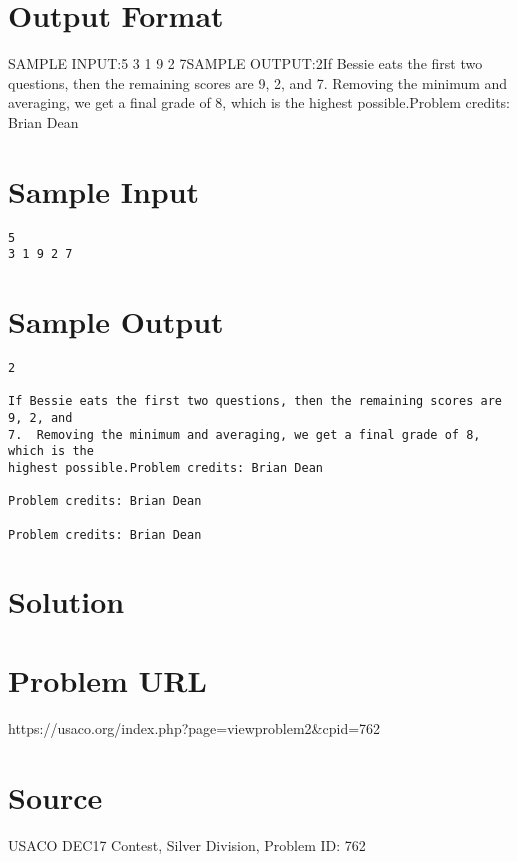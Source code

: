 \documentclass[12pt]{article}
\begin{document}
\section*{Output Format}
SAMPLE INPUT:5
3 1 9 2 7SAMPLE OUTPUT:2If Bessie eats the first two questions, then the remaining scores are 9, 2, and
7.  Removing the minimum and averaging, we get a final grade of 8, which is the
highest possible.Problem credits: Brian Dean

\section*{Sample Input}
\begin{verbatim}
5
3 1 9 2 7
\end{verbatim}

\section*{Sample Output}
\begin{verbatim}
2

If Bessie eats the first two questions, then the remaining scores are 9, 2, and
7.  Removing the minimum and averaging, we get a final grade of 8, which is the
highest possible.Problem credits: Brian Dean

Problem credits: Brian Dean

Problem credits: Brian Dean
\end{verbatim}

\section*{Solution}


\section*{Problem URL}
https://usaco.org/index.php?page=viewproblem2&cpid=762

\section*{Source}
USACO DEC17 Contest, Silver Division, Problem ID: 762
\end{document}
